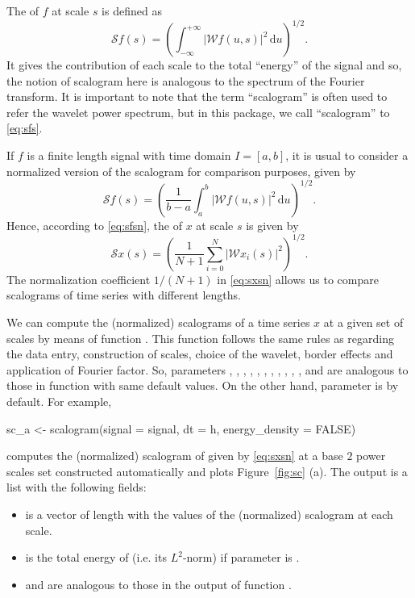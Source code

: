 The  of $f$ at scale $s$ is defined as
\begin{equation}
\label{eq:sfs}
\mathcal{S}f(s)= \left( \int _{-\infty } ^{+\infty } | \mathcal{W}f\left( u,s\right) | ^2 \, \textrm{d}u \right) ^{1/2} .
\end{equation}
It gives the contribution of each scale to the total ``energy'' of the signal and so, the notion of scalogram here is analogous to the spectrum of the Fourier transform. It is important to note that the term ``scalogram'' is often used to refer the wavelet power spectrum, but in this package, we call ``scalogram'' to \eqref{eq:sfs}.

If $f$ is a finite length signal with time domain $I=\left[ a,b\right] $, it is usual to consider a normalized version of the scalogram for comparison purposes, given by
\begin{equation}
\label{eq:sfsn}
\mathcal{S}f(s)= \left( \frac{1}{b-a}\int _{a}^{b} | \mathcal{W}f\left( u,s\right) | ^2 \, \textrm{d}u \right) ^{1/2} .
\end{equation}
Hence, according to \eqref{eq:sfsn}, the  of $x$ at scale $s$ is given by
\begin{equation}
\label{eq:sxsn}
\mathcal{S}x(s) = \left( \frac{1}{N+1}\sum _{i=0}^{N} | \mathcal{W}x_i(s) | ^2 \right) ^{1/2}.
\end{equation}
The normalization coefficient $1/(N+1)$ in \eqref{eq:sxsn} allows us to compare scalograms of time series with different lengths.

We can compute the (normalized) scalograms of a time series $x$ at a given set of scales by means of function . This function follows the same rules as  regarding the data entry, construction of scales, choice of the wavelet, border effects and application of Fourier factor. So, parameters , , , , , , , , , , ,  and  are analogous to those in function  with same default values. On the other hand, parameter  is  by default. For example,
\begin{example}
sc_a <- scalogram(signal = signal, dt = h,
                  energy_density = FALSE)
\end{example}
computes the (normalized) scalogram of  given by \eqref{eq:sxsn} at a base $2$ power scales set constructed automatically and plots Figure~\ref{fig:sc} (a). The output  is a list with the following fields:
\begin{itemize}
\item {} is a vector of length  with the values of the (normalized) scalogram at each scale.
\item {} is the total energy of  (i.e. its $L^2$-norm) if parameter  is .
\item {} and  are analogous to those in the output of function .
\end{itemize}


